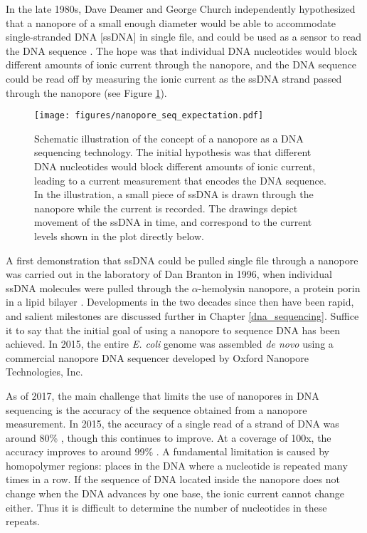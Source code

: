 In the late 1980s, Dave Deamer and George Church independently hypothesized that a nanopore of a small enough diameter would be able to accommodate single-stranded DNA [ssDNA] in single file, and could be used as a sensor to read the DNA sequence \citep{Branton2008}.  The hope was that individual DNA nucleotides would block different amounts of ionic current through the nanopore, and the DNA sequence could be read off by measuring the ionic current as the ssDNA strand passed through the nanopore (see Figure \ref{fig:nanopore_seq_expectation}).

\begin{figure}[h]
\begin{centering}
\texttt{[image: figures/nanopore\_seq\_expectation.pdf]}
\caption[Nanopore DNA sequencing concept]{Schematic illustration of the concept of a nanopore as a DNA sequencing technology.  The initial hypothesis was that different DNA nucleotides would block different amounts of ionic current, leading to a current measurement that encodes the DNA sequence.  In the illustration, a small piece of ssDNA is drawn through the nanopore while the current is recorded.  The drawings depict movement of the ssDNA in time, and correspond to the current levels shown in the plot directly below.}
\label{fig:nanopore_seq_expectation}
\end{centering}
\end{figure}

A first demonstration that ssDNA could be pulled single file through a nanopore was carried out in the laboratory of Dan Branton in 1996, when individual ssDNA molecules were pulled through the $\alpha$-hemolysin nanopore, a protein porin in a lipid bilayer \citep{Kasianowicz1996}.  Developments in the two decades since then have been rapid, and salient milestones are discussed further in Chapter \ref{dna_sequencing}.  Suffice it to say that the initial goal of using a nanopore to sequence DNA has been achieved.  In 2015, the entire \textit{E. coli} genome was assembled \textit{de novo} using a commercial nanopore DNA sequencer\citep{Loman2015} developed by Oxford Nanopore Technologies, Inc.

As of 2017, the main challenge that limits the use of nanopores in DNA sequencing is the accuracy of the sequence obtained from a nanopore measurement.  In 2015, the accuracy of a single read of a strand of DNA was around 80\% \citep{Loman2015}, though this continues to improve.  At a coverage of 100x, the accuracy improves to around 99\% \citep{Szalay2015a}.  A fundamental limitation is caused by homopolymer regions: places in the DNA where a nucleotide is repeated many times in a row.  If the sequence of DNA located inside the nanopore does not change when the DNA advances by one base, the ionic current cannot change either.  Thus it is difficult to determine the number of nucleotides in these repeats.

